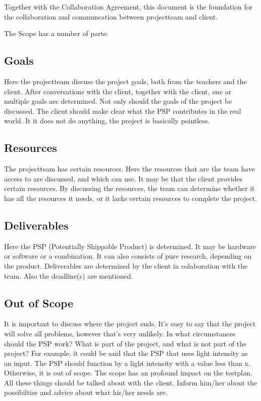 \documentclass[10pt]{report}
\begin{document}
Together with the Collaboration Agreement, this document is the foundation for the collaboration and communcation between projectteam and client.

The Scope has a number of parts:

\subsection{Goals}

Here the projectteam discuss the project goals, both from the teachers and the client. After conversations with the client, together with the client, one or multiple goals are determined. Not only should the goals of the project be discussed. The client should make clear what the PSP contributes in the real world. It it does not do anything, the project is basically pointless.

\subsection{Resources}

The projectteam has certain resources. Here the resources that are the team have access to are discussed, and which  can use. It may be that the client provides certain resources. By discussing the resources, the team can determine whether it has all the resources it needs, or it lacks certain resources to complete the project.

\subsection{Deliverables}

Here the PSP (Potentially Shippable Product) is determined. It may be hardware or software or a combination. It can also consists of pure research, depending on the product. Deliverables are determined by the client in colaboration with the team. Also the deadline(s) are mentioned.

\subsection{Out of Scope}

It is important to discuss where the project ends. It's easy to say that the project will solve all problems, however that's very unlikely. In what circumstances should the PSP work? What is part of the project, and what is not part of the project? For example, it could be said that the PSP that uses light intensity as an input. The PSP should function by a light intensity with a value less than x. Otherwise, it is out of scope. The scope has an profound impact on the testplan. All these things should be talked about with the client. Inform him/her about the possibilties and advice about what his/her needs are.
\end{document}

